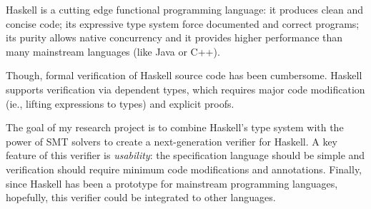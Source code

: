Haskell is a cutting edge functional programming language:
it produces clean and concise code;
its expressive type system force documented and correct programs; 
its purity allows native concurrency and 
it provides higher performance than many mainstream languages (like Java or C++). 


Though, formal verification of Haskell source code has been cumbersome.
Haskell supports verification via dependent types, which requires  
major code modification (ie., lifting expressions to types)
and explicit proofs.
%

The goal of my research project is to combine Haskell's type system with 
the power of SMT solvers to 
create a next-generation verifier for Haskell.
%
A key feature of this verifier is  \textit{usability}:
the specification language should be simple and 
verification should require minimum code modifications and annotations. 
%
Finally, since Haskell has been a prototype for mainstream programming languages,
hopefully, this verifier could be integrated to other languages.
